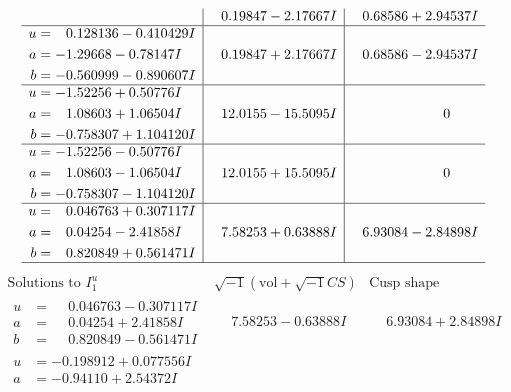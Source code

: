 \documentclass[1p]{elsarticle_modified}
\theoremstyle{definition}
\newcommand{\I}{\sqrt{-1}}
\begin{document}
$$\begin{array}{c|c|c}
 & \phantom{-}0.19847 - 2.17667 I & \phantom{-}0.68586 + 2.94537 I \\ \hline\begin{aligned}
u &= \phantom{-}0.128136 - 0.410429 I \\
a &= -1.29668 - 0.78147 I \\
b &= -0.560999 - 0.890607 I\end{aligned}
 & \phantom{-}0.19847 + 2.17667 I & \phantom{-}0.68586 - 2.94537 I \\ \hline\begin{aligned}
u &= -1.52256 + 0.50776 I \\
a &= \phantom{-}1.08603 + 1.06504 I \\
b &= -0.758307 + 1.104120 I\end{aligned}
 & \phantom{-}12.0155 - 15.5095 I & \phantom{-0.000000 } 0 \\ \hline\begin{aligned}
u &= -1.52256 - 0.50776 I \\
a &= \phantom{-}1.08603 - 1.06504 I \\
b &= -0.758307 - 1.104120 I\end{aligned}
 & \phantom{-}12.0155 + 15.5095 I & \phantom{-0.000000 } 0 \\ \hline\begin{aligned}
u &= \phantom{-}0.046763 + 0.307117 I \\
a &= \phantom{-}0.04254 - 2.41858 I \\
b &= \phantom{-}0.820849 + 0.561471 I\end{aligned}
 & \phantom{-}7.58253 + 0.63888 I & \phantom{-}6.93084 - 2.84898 I\\
 \hline 
 \end{array}$$\newpage$$\begin{array}{c|c|c}  
\text{Solutions to }I^u_{1}& \I (\text{vol} + \sqrt{-1}CS) & \text{Cusp shape}\\
 \hline 
\begin{aligned}
u &= \phantom{-}0.046763 - 0.307117 I \\
a &= \phantom{-}0.04254 + 2.41858 I \\
b &= \phantom{-}0.820849 - 0.561471 I\end{aligned}
 & \phantom{-}7.58253 - 0.63888 I & \phantom{-}6.93084 + 2.84898 I \\ \hline\begin{aligned}
u &= -0.198912 + 0.077556 I \\
a &= -0.94110 + 2.54372 I \\

\end{aligned}
\end{array}$$
\end{document}
